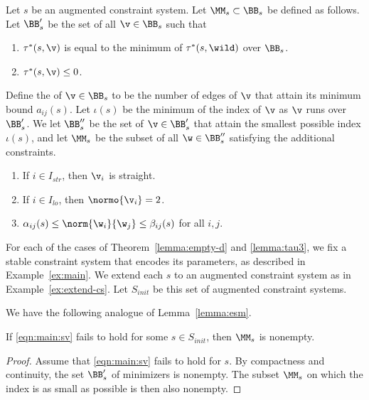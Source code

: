 \begin{definition}
Let $s$ be an augmented constraint system.
Let $\MM_{s}\subset \BB_{s}$ be defined as follows.
Let $\BB'_{s}$ be the set of all $\v\in \BB_{s}$ such that
\begin{enumerate}
\item $\tau^*(s,\v)$ is equal to the minimum of $\tau^*(s,\wild)$ over $\BB_{s}$.
\item $\tau^*(s,\v)\le 0$.
\end{enumerate}
Define the  of $\v\in \BB_s$ to be the number of edges of $\v$
that attain its minimum bound $a_{i j}(s)$.  Let $\iota(s)$ be the minimum
of the index of $\v$ as $\v$ runs over $\BB'_s$.  
We let $\BB''_{s}$  be the set of $\v\in \BB'_{s}$ that attain
the smallest possible index $\iota(s)$,
and let $\MM_s$ be the subset of all $\w\in\BB''_s$ satisfying the additional
constraints.
\begin{enumerate}
\item If $i\in I_{str}$,  then $\v_i$ is straight.
\item If $i\in I_{lo}$,  then $\normo{\v_i}=2$.
\item $\alpha_{ij}(s)\le \norm{\w_i}{\w_j}\le \beta_{ij}(s)$ for all $i,j$.
\end{enumerate}
\end{definition}



\begin{definition}[$S_{init}$] 
For each of the cases of Theorem~\ref{lemma:empty-d} and \ref{lemma:tau3}, we fix a
stable constraint system that encodes its parameters, as described in Example~\ref{ex:main}. 
We extend each $s$ to an augmented constraint system
as in Example~\ref{ex:extend-cs}.
Let $S_{init}$ be this set of  augmented constraint systems.
\end{definition}

We have the following analogue of Lemma~\ref{lemma:esm}.

\begin{lemma}\label{lemma:init}
If \eqref{eqn:main:sv} fails to hold for some $s\in S_{init}$, 
then $\MM_s$ is nonempty.
\end{lemma}

\begin{proof}  Assume that \eqref{eqn:main:sv} fails to hold for
$s$.  By compactness and continuity, the set 
$\BB'_s$ of minimizers is nonempty.   
The subset $\MM_s$ on which the index is as small as possible
is then also nonempty.
\end{proof}

